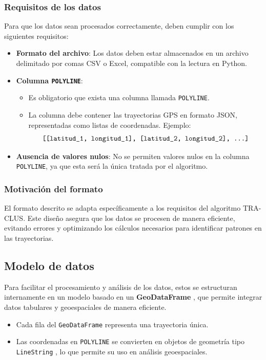 \subsubsection{Requisitos de los datos}

Para que los datos sean procesados correctamente, deben cumplir con los siguientes requisitos:

\begin{itemize}
    \item \textbf{Formato del archivo}: Los datos deben estar almacenados en un archivo delimitado por comas CSV o Excel, compatible con la lectura en Python.
    \item \textbf{Columna \texttt{POLYLINE}}: 
    \begin{itemize}
        \item Es obligatorio que exista una columna llamada \texttt{POLYLINE}.
        \item La columna debe contener las trayectorias GPS en formato JSON, representadas como listas de coordenadas. Ejemplo:
        \[\texttt{[[latitud\_1, longitud\_1], [latitud\_2, longitud\_2], \dots]}\]
    \end{itemize}
    \item \textbf{Ausencia de valores nulos}: No se permiten valores nulos en la columna \texttt{POLYLINE}, ya que esta será la única tratada por el algoritmo.
\end{itemize}

\subsubsection{Motivación del formato}

El formato descrito se adapta específicamente a los requisitos del algoritmo TRA-CLUS. Este diseño asegura que los datos se procesen de manera eficiente, evitando errores y optimizando los cálculos necesarios para identificar patrones en las trayectorias.

\subsection{Modelo de datos}

Para facilitar el procesamiento y análisis de los datos, estos se estructuran internamente en un modelo basado en un \textbf{GeoDataFrame} \cite{geopandas2023}, que permite integrar datos tabulares y geoespaciales de manera eficiente.

\begin{itemize}
    \item Cada fila del \texttt{GeoDataFrame} \cite{geopandas2023} representa una trayectoria única.
    \item Las coordenadas en \texttt{POLYLINE} se convierten en objetos de geometría tipo \texttt{LineString} \cite{shapely2023}, lo que permite su uso en análisis geoespaciales.
\end{itemize}

